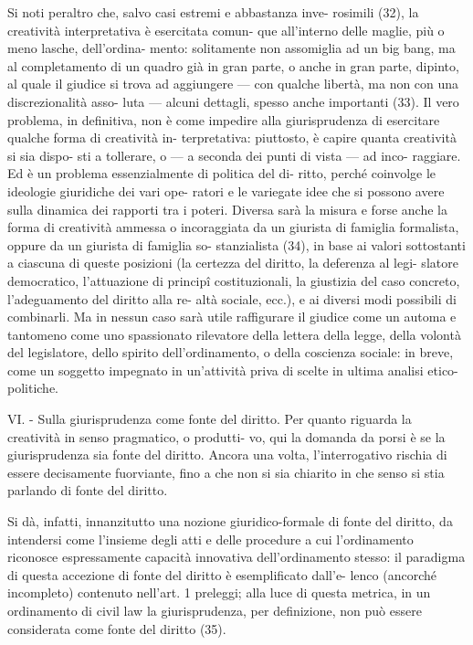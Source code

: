 Si  noti  peraltro  che,  salvo  casi  estremi  e  abbastanza  inve-
rosimili  (32),  la  creatività  interpretativa  è  esercitata  comun-
que  all’interno  delle  maglie,  più  o  meno  lasche,  dell’ordina-
mento:  solitamente  non  assomiglia  ad  un  big  bang,  ma  al 
completamento  di  un  quadro  già  in  gran  parte,  o  anche  in 
gran parte, dipinto, al quale il giudice si trova ad aggiungere 
— con qualche libertà, ma non con una discrezionalità asso-
luta — alcuni dettagli, spesso anche importanti (33).  
Il  vero  problema,  in  definitiva,  non  è  come  impedire  alla 
giurisprudenza  di  esercitare  qualche  forma  di  creatività  in-
terpretativa: piuttosto, è capire quanta creatività si sia dispo-
sti  a  tollerare,  o  —  a  seconda  dei  punti  di  vista  —  ad  inco-
raggiare. Ed è un problema essenzialmente di politica del di-
ritto,  perché  coinvolge  le  ideologie  giuridiche  dei  vari  ope-
ratori e le variegate idee che si possono avere sulla dinamica 
dei rapporti tra i poteri. Diversa sarà la misura e forse anche 
la  forma  di  creatività  ammessa  o  incoraggiata  da  un  giurista 
di  famiglia  formalista,  oppure  da  un  giurista  di  famiglia  so-
stanzialista  (34),  in  base  ai  valori  sottostanti  a  ciascuna  di 
queste  posizioni  (la  certezza  del  diritto,  la  deferenza  al  legi-
slatore democratico, l’attuazione di principî costituzionali, la 
giustizia del caso concreto, l’adeguamento del diritto alla re-
altà  sociale,  ecc.),  e  ai  diversi  modi  possibili  di  combinarli. 
Ma  in  nessun  caso  sarà  utile  raffigurare  il  giudice  come  un 
automa  e  tantomeno  come  uno  spassionato  rilevatore  della 
lettera  della  legge,  della  volontà  del  legislatore,  dello  spirito 
dell’ordinamento,  o  della  coscienza  sociale:  in  breve,  come un soggetto impegnato in un’attività priva di scelte in ultima 
analisi etico-politiche.  


VI.  -  Sulla  giurisprudenza  come  fonte  del  diritto.  Per 
quanto riguarda la creatività in senso pragmatico, o produtti-
vo,  qui  la  domanda  da  porsi  è  se  la  giurisprudenza  sia  fonte 
del diritto. Ancora una volta, l’interrogativo rischia di essere 
decisamente  fuorviante,  fino  a  che  non  si  sia  chiarito  in  che 
senso si stia parlando di fonte del diritto.  

Si  dà,  infatti,  innanzitutto  una  nozione  giuridico-formale 
di  fonte  del  diritto,  da  intendersi  come  l’insieme  degli  atti  e 
delle procedure a cui l’ordinamento riconosce espressamente 
capacità  innovativa  dell’ordinamento  stesso:  il  paradigma  di 
questa  accezione  di  fonte  del  diritto  è  esemplificato  dall’e-
lenco  (ancorché  incompleto)  contenuto  nell’art.  1  preleggi; 
alla luce di questa metrica, in un ordinamento di civil law la 
giurisprudenza,  per  definizione,  non  può  essere  considerata 
come fonte del diritto (35).  


